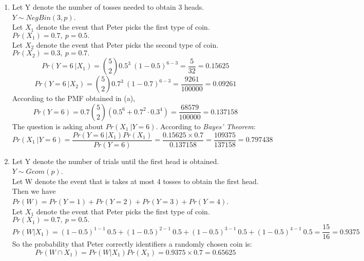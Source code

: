 \documentclass[11pt]{article}
\begin{document}
\begin{enumerate}[label=\textbf{Question \arabic*:},start=1]
\begin{enumerate}
\begin{enumerate}
  \end{enumerate}

  \item Let Y denote the number of tosses needed to obtain 3 heads. \( Y \sim NegBin(3, p) \). \\
Let \( X_1 \) denote the event that Peter picks the first type of coin. \(Pr(X_1) = 0.7, \  p = 0.5.\) \\
Let \( X_2 \) denote the event that Peter picks the second type of coin. \( Pr(X_2) = 0.3, \ p = 0.7.\) \\
\[
Pr(Y=6 \ | X_1) = {5 \choose 2} 0.5^3 \ (1-0.5)^{6-3} = \frac{5}{32} = 0.15625
\]
\[
Pr(Y=6 \ | X_2) = {5 \choose 2} 0.7^3 \ (1-0.7)^{6-3} = \frac{9261}{100000} = 0.09261
\]
According to the PMF obtained in (a),
\[
Pr(Y = 6) = 0.7 {5 \choose 2} ( 0.5^6 + 0.7^2 \cdot 0.3^4 ) = \frac{68579}{100000} = 0.137158
\]
The question is asking about \( Pr(X_1 \ | Y = 6) \). According to \textit{Bayes' Theorem}:
\[
Pr(X_1 \ | Y = 6) = \frac{Pr(Y = 6 \  | X_1) Pr(X_1)}{Pr(Y = 6)} = \frac{0.15625 \times 0.7}{0.137158} = \frac{109375}{137158} = 0.797438
\]


  \item Let Y denote the number of trials until the first head is obtained. \( Y \sim Geom(p) \).\\
Let W denote the event that is takes at most 4 tosses to obtain the first head.\\
Then we have \( Pr(W) = Pr(Y = 1) + Pr(Y = 2) + Pr(Y = 3) + Pr(Y = 4)\). \\
Let \( X_1 \) denote the event that Peter picks the first type of coin. \(Pr(X_1) = 0.7, \  p = 0.5.\) \\
\[
Pr(W | X_1) = (1-0.5)^{1-1} \ 0.5 + (1-0.5)^{2-1}\ 0.5 + (1-0.5)^{3-1} \ 0.5 + (1 - 0.5)^{4-1} \ 0.5 = \frac{15}{16} = 0.9375
\]
So the probability that Peter correctly identifiers a randomly chosen coin is:
\[
Pr(W \cap X_1) = Pr(W | X_1) Pr(X_1) = 0.9375 \times 0.7 = 0.65625
\]
\end{enumerate}






\end{enumerate}
\end{document}
